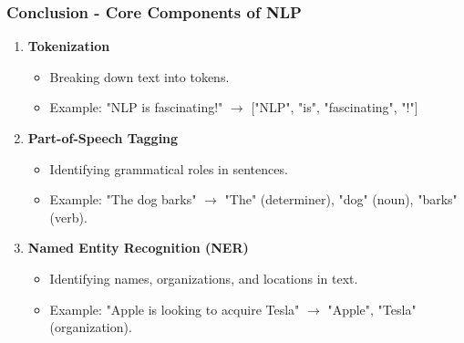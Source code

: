 \documentclass[aspectratio=169]{beamer}
\begin{document}
\begin{frame}[fragile]
    \frametitle{Conclusion - Core Components of NLP}
    \begin{enumerate}
        \item \textbf{Tokenization}
            \begin{itemize}
                \item Breaking down text into tokens.
                \item Example: "NLP is fascinating!" $\rightarrow$ ["NLP", "is", "fascinating", "!"]
            \end{itemize}
        
        \item \textbf{Part-of-Speech Tagging}
            \begin{itemize}
                \item Identifying grammatical roles in sentences.
                \item Example: "The dog barks" $\rightarrow$ "The" (determiner), "dog" (noun), "barks" (verb).
            \end{itemize}
        
        \item \textbf{Named Entity Recognition (NER)}
            \begin{itemize}
                \item Identifying names, organizations, and locations in text.
                \item Example: "Apple is looking to acquire Tesla" $\rightarrow$ "Apple", "Tesla" (organization).
            \end{itemize}
    \end{enumerate}
\end{frame}
\end{document}
